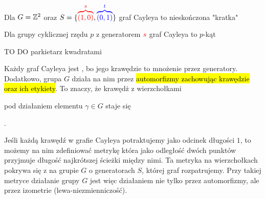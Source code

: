 \begin{example}[m]
\item Dla $G=\mathbb{Z}^2$ oraz $S=\{{\color{red}\overbrace{(1, 0)}^s}, {\color{blue}\overbrace{(0, 1)}^t}\}$ graf Cayleya to nieskończona "kratka"
  \bigskip

  \begin{center}
  \end{center}
\item Dla grupy cyklicznej rzędu $p$ z generatorem $\color{red}s$ graf Cayleya to $p$-kąt
  \begin{center}
  \end{center}
\item {\color{red}\Large TO DO} parkietarz kwadratami
\end{example}

Każdy graf Cayleya jest , bo jego krawędzie to mnożenie przez generatory. Dodatkowo, grupa $G$ działa na nim przez \hl{automorfizmy zachowując krawędzie oraz ich etykiety}. To znaczy, że krawędż z wierzchołkami  pod działaniem elementu $\gamma \in G$ staje się .

Jeśli każdą krawędź w grafie Cayleya potraktujemy jako odcinek długości $1$, to możemy na nim zdefiniować metrykę która jako odległość dwóch punktów przyjmuje długość najkrótszej ścieżki między nimi. Ta metryka na wierzchołkach pokrywa się z  na grupie $G$ o generatorach $S$, której graf rozpatrujemy. Przy takiej metryce działanie grupy $G$ jest więc działaniem nie tylko przez automorfizmy, ale przez izometrie (lewa-niezmienniczość).

